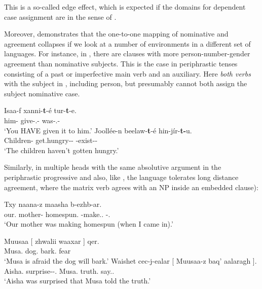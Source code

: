 \documentclass[output=paper]{langsci/langscibook}
\begin{document}
This is a so-called edge effect, which is expected if the domains for dependent
case assignment are  in the sense of \citet{Chomsky2001}.

Moreover, \citet{Baker2015} demonstrates that the one-to-one mapping of
nominative and agreement collapses if we look at a number of environments in a
different set of languages. For instance, in , there are clauses
with more person-number-gender agreement than nominative subjects. This is the
case in periphrastic tenses consisting of a past or imperfective main verb and
an auxiliary. Here \emph{both verbs}  with the subject in
, including person, but presumably cannot both assign the
subject nominative case.

\ea%
    \label{ex:key:13.15} \parencite[99]{Baker2015}
	\ea
	\gll  Isaa-f xanni-\textbf{t}-é  tur-\textbf{t}-e.\\
	    him-\Dat{}  give-\Tsg.\Sbj{}-\Pst{}  was-\Tsg.\Sbj{}-\Pst{}\\
	\glt     ‘You HAVE given it to him.’
	\ex
	\gll  Joollée-n beelaw-\textbf{t}-é  hin-jír-\textbf{t-}u.\\
        Children-\Mnom{}  get.hungry-\glossF{}-\Pst{} \Neg{}-exist-\glossF{}-\Dep{}\\
	\glt     ‘The children haven’t gotten hungry.’
    \z
\z

Similarly, in  multiple heads  with the same
absolutive argument in the periphrastic progressive
\citep[71--72]{Baker2015} and also, like  \parencite{PolPot2001}, the
language tolerates long distance agreement, where the matrix verb agrees with an NP inside an embedded clause):

\ea%
    \label{ex:key:13.16} \citep[263]{Nichols2011}
    \sn
    \gll  Txy naana-z maasha b-ezhb-ar.\\
            our.\Gen{}  mother-\Erg{}  homespun.\Bb{} \Bb{}-make.\Cvb.\Sim{} \Bb{}-\Prog.\Pst\\
    \glt  ‘Our mother was making homespun (when I came in).’
\z

\ea%
    \label{ex:key:13.17} \parencite[551, 550]{Nichols2011}
	\ea
	\gll  Muusaa  [ zhwalii waaxar ]  qer.\\
            Musa.\Abs{} {} dog.\Abs{}  bark.\Vn{} {} fear\\
	\glt     ‘Musa is afraid the dog will bark.’
	\ex
	\gll  Waishet cec-j-ealar  [ Muusaa-z baq’  aalaragh ].\\
            Aisha.\Abs{}  surprise-\Jj-\Lv{}.\Pst{} {}  Musa.\Erg{} truth.\Abs{}  say.\Vn{}.\Lat{} {}\\
	\glt     ‘Aisha was surprised that Musa told the truth.’
    \z
\z
\end{document}
